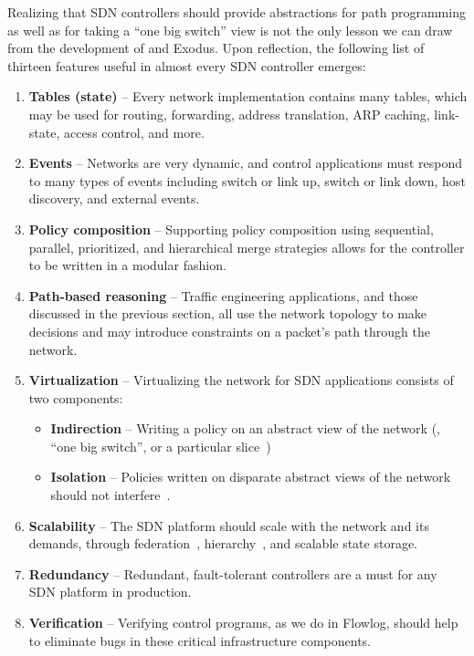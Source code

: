Realizing that SDN controllers should provide abstractions for path programming as well as
for taking a ``one big switch'' view is not the only lesson we can draw from the development
of \sys and Exodus. Upon reflection, the following list of thirteen features useful in almost every
SDN controller emerges:

\begin{enumerate}
\item {\bf Tables (state)} -- Every network implementation contains many tables, which may be used for routing, forwarding,
address translation, ARP caching, link-state, access control, and more.
\item {\bf Events} -- Networks are very dynamic, and control applications must respond to many
types of events including switch or link up, switch or link down, host discovery, and external events.
\item {\bf Policy composition} -- Supporting policy composition using sequential, parallel, prioritized,
and hierarchical merge strategies allows for the controller to be written in a modular fashion.
\item {\bf Path-based reasoning} -- Traffic engineering applications, and those discussed in the
previous section, all use the network topology to make decisions and may introduce constraints
on a packet's path through the network.
\item {\bf Virtualization} -- Virtualizing the network for SDN applications consists of two components:
	\begin{itemize}
	\item {\bf Indirection} -- Writing a policy on an abstract view of the network (\eg, ``one big switch'', or a particular slice~\cite{gutz:hotsdn12-slices})
	\item {\bf Isolation} -- Policies written on disparate abstract views of the network should not interfere~\cite{Sherwood:2010}.
	\end{itemize}
\item {\bf Scalability} -- The SDN platform should scale with the network and its demands, through
federation~\cite{Tootoonchian:2010}, hierarchy~\cite{kandoo,logical_xbars}, and scalable state storage.
\item {\bf Redundancy} -- Redundant, fault-tolerant controllers are a must for any SDN platform in production.
\item {\bf Verification} -- Verifying control programs, as we do in Flowlog, should help to eliminate
bugs in these critical infrastructure components.

\end{enumerate}

